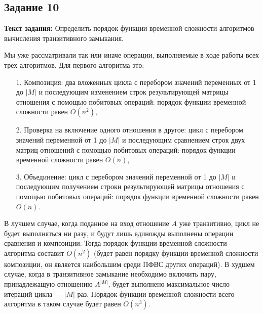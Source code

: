 \documentclass[12pt]{article}
\begin{document}
	\subsection{Задание 10}
	\label{tas10}
	{\bf Текст задания:} Определить порядок функции временной сложности алгоритмов вычисления транзитивного замыкания.
	
	Мы уже рассматривали так или иначе операции, выполняемые в ходе работы всех трех алгоритмов. Для первого алгоритма это:
	\begin{itemize}
		\item[1.] Композиция: два вложенных цикла с перебором значений переменных от 1 до $|M|$ и последующим изменением строк результирующей матрицы отношения с помощью побитовых операций: порядок функции временной сложности равен $O(n^2)$,
		\item[2.] Проверка на включение одного отношения в другое: цикл с перебором значений переменной от 1 до $|M|$ и последующим сравнением строк двух матриц отношений с помощью побитовых операций: порядок функции временной сложности равен $O(n)$,
		\item[3.] Объединение: цикл с перебором значений переменной от 1 до $|M|$ и последующим получением строки результирующей матрицы отношения с помощью побитовых операций: порядок функции временной сложности равен $O(n)$.
	\end{itemize}
	В лучшем случае, когда поданное на вход отношение $A$ уже транзитивно, цикл не будет выполняться ни разу, и будут лишь единожды выполнены операции сравнения и композиции. Тогда порядок функции временной сложности алгоритма составит $O(n^2)$ (будет равен порядку функции временной сложности композиции, он является наибольшим среди ПФВС других операций). В худшем случае, когда в транзитивное замыкание необходимо включить пару, принадлежащую отношению $A^{|M|}$, будет выполнено максимальное число итераций цикла --- $|M|$ раз. Порядок функции временной сложности всего алгоритма в таком случае будет равен $O(n^3)$.
\end{document}
